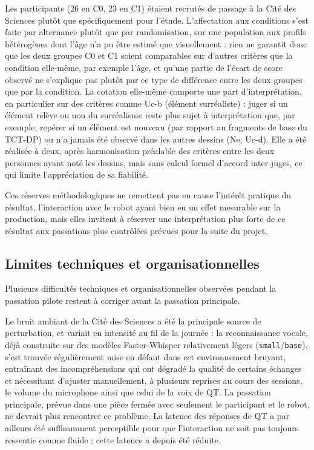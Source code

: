 \documentclass[11pt]{article}
\begin{document}
Les participants (26 en C0, 23 en C1) étaient recrutés de passage à la Cité des Sciences plutôt que spécifiquement pour l'étude.
L'affectation aux conditions s'est faite par alternance plutôt que par randomisation, sur une population aux profils hétérogènes dont l'âge n'a pu être estimé que visuellement : rien ne garantit donc que les deux groupes C0 et C1 soient comparables sur d'autres critères que la condition elle-même, par exemple l'âge, et qu'une partie de l'écart de score observé ne s'explique pas plutôt par ce type de différence entre les deux groupes que par la condition.
La cotation elle-même comporte une part d'interprétation, en particulier sur des critères comme Uc-b (élément surréaliste) : juger si un élément relève ou non du surréalisme reste plus sujet à interprétation que, par exemple, repérer si un élément est nouveau (par rapport au fragments de base du TCT-DP) ou n'a jamais été observé dans les autres dessins (Ne, Uc-d).
Elle a été réalisée à deux, après harmonisation préalable des critères entre les deux personnes ayant noté les dessins, mais sans calcul formel d'accord inter-juges, ce qui limite l'appréciation de sa fiabilité.

Ces réserves méthodologiques ne remettent pas en cause l'intérêt pratique du résultat, l'interaction avec le robot ayant bien eu un effet mesurable sur la production, mais elles invitent à réserver une interprétation plus forte de ce résultat aux passations plus contrôlées prévues pour la suite du projet.

\subsection{Limites techniques et organisationnelles}
\label{sec:limites_techniques}

Plusieurs difficultés techniques et organisationnelles observées pendant la passation pilote restent à corriger avant la passation principale.

Le bruit ambiant de la Cité des Sciences a été la principale source de perturbation, et variait en intensité au fil de la journée : la reconnaissance vocale, déjà construite sur des modèles Faster-Whisper relativement légers (\texttt{small}/\texttt{base}), s'est trouvée régulièrement mise en défaut dans cet environnement bruyant, entraînant des incompréhensions qui ont dégradé la qualité de certains échanges et nécessitant d'ajuster manuellement, à plusieurs reprises au cours des sessions, le volume du microphone ainsi que celui de la voix de QT.
La passation principale, prévue dans une pièce fermée avec seulement le participant et le robot, ne devrait plus rencontrer ce problème.
La latence des réponses de QT a par ailleurs été suffisamment perceptible pour que l'interaction ne soit pas toujours ressentie comme fluide ; cette latence a depuis été réduite.
\end{document}
